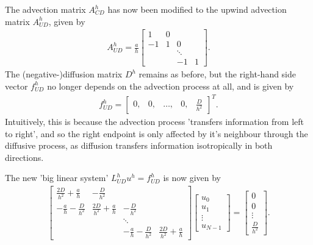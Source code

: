 \begin{problem}{1}
\begin{solution}
The advection matrix $A^h_{CD}$ has now been modified to the upwind
advection matrix $A^h_{UD}$, given by
\begin{align*}
    A^h_{UD} = \frac{a}{h}
    \begin{bmatrix}
		1  &  0 &         &    \\
	   -1  &  1 &  0      &    \\
		   &    &  \ddots &    \\
		   &    &      -1 &  1
    \end{bmatrix}.
\end{align*}
The (negative-)diffusion matrix $D^h$ remains as before, but the
right-hand side vector $f^h_{UD}$ no longer depends on the advection
process at all, and is given by
\begin{align*}
	f^h_{UD} =
    \begin{bmatrix}
	    0, & 0, & \hdots, & 0, & \frac{D}{h^2}
	\end{bmatrix}^T.
\end{align*}
Intuitively, this is because the advection process 'transfers 
information from left to right', and so the right endpoint is only
affected by it's neighbour through the diffusive process, as diffusion
transfers information isotropically in both directions.

The new 'big linear system' $L^h_{UD}u^h=f^h_{UD}$ is now given by
\begin{align*}
    \begin{bmatrix}
	    \frac{2D}{h^2} + \frac{a}{h} & - \frac{D}{h^2} &  & \\
	   -\frac{a}{h} - \frac{D}{h^2}  & \frac{2D}{h^2} + \frac{a}{h} & -\frac{D}{h^2} & \\
	   & & \ddots & \\
	   & & -\frac{a}{h} - \frac{D}{h^2} & \frac{2D}{h^2} + \frac{a}{h}
    \end{bmatrix}
    \begin{bmatrix}
        u_0 \\ u_1 \\ \vdots \\ u_{N-1}
    \end{bmatrix}
    =
    \begin{bmatrix}
	    0 \\ 0 \\ \vdots \\ \frac{D}{h^2}
	\end{bmatrix}.
\end{align*}


\end{solution}
\end{problem}
